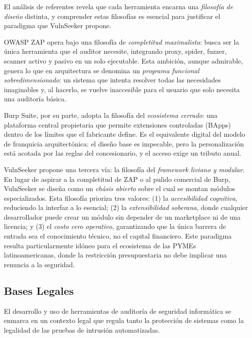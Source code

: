 \documentclass[12pt, a4paper]{article}
\begin{document}
El análisis de referentes revela que cada herramienta encarna una
\textit{filosofía de diseño} distinta, y comprender estas filosofías es
esencial para justificar el paradigma que VulnSeeker propone.

OWASP ZAP opera bajo una filosofía de \textit{completitud maximalista}: busca
ser la única herramienta que el auditor necesite, integrando proxy, spider,
fuzzer, scanner activo y pasivo en un solo ejecutable. Esta ambición, aunque
admirable, genera lo que en arquitectura se denomina un \textit{programa
funcional sobredimensionado}: un sistema que intenta resolver todas las
necesidades imaginables y, al hacerlo, se vuelve inaccesible para el usuario
que solo necesita una auditoría básica.

Burp Suite, por su parte, adopta la filosofía del \textit{ecosistema
cerrado}: una plataforma central propietaria que permite extensiones
controladas (BApps) dentro de los límites que el fabricante define. Es el
equivalente digital del modelo de franquicia arquitectónica: el diseño base
es impecable, pero la personalización está acotada por las reglas del
concesionario, y el acceso exige un tributo anual.

VulnSeeker propone una tercera vía: la filosofía del \textit{framework
liviano y modular}. En lugar de aspirar a la completitud de ZAP o al pulido
comercial de Burp, VulnSeeker se diseña como un \textit{chásis abierto}
sobre el cual se montan módulos especializados. Esta filosofía prioriza tres
valores: (1) la \textit{accesibilidad cognitiva}, reduciendo la interfaz a
lo esencial; (2) la \textit{extensibilidad soberana}, donde cualquier
desarrollador puede crear un módulo sin depender de un marketplace ni de una
licencia; y (3) el \textit{costo cero operativo}, garantizando que la única barrera de entrada sea el conocimiento técnico, no el capital financiero.
Este paradigma resulta particularmente idóneo para el ecosistema de las PYMEs
latinoamericanas, donde la restricción presupuestaria no debe implicar una
renuncia a la seguridad.

\subsection{Bases Legales}

El desarrollo y uso de herramientas de auditoría de seguridad informática se
enmarca en un contexto legal que regula tanto la protección de sistemas como la
legalidad de las pruebas de intrusión automatizadas.
\end{document}
